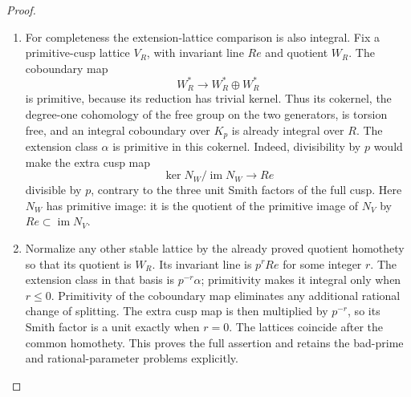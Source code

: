 \documentclass[11pt,a4paper]{article}
\theoremstyle{definition}
\begin{document}
\begin{proof}
\begin{enumerate}[label=\arabic*.]
\item For completeness the extension-lattice comparison is also
integral.  Fix a primitive-cusp lattice $V_R$, with invariant
line $Re$ and quotient $W_R$.
The coboundary map
\[
 W_R^*\longrightarrow W_R^*\oplus W_R^*
\]
is primitive, because its reduction has trivial kernel.
Thus its cokernel, the degree-one cohomology of the free
group on the two generators, is torsion free, and an
integral coboundary over $K_p$ is already integral over $R$.
The extension class $\alpha$ is primitive in this cokernel.
Indeed, divisibility by $p$ would make the extra cusp map
\[
 \ker N_W/\operatorname{im}N_W\longrightarrow Re
\]
divisible by $p$, contrary to the three unit Smith factors
of the full cusp.  Here $N_W$ has primitive image:
it is the quotient of the primitive image of $N_V$ by
$Re\subset\operatorname{im}N_V$.

\item Normalize any other stable lattice by the already proved
quotient homothety so that its quotient is $W_R$.
Its invariant line is $p^rRe$ for some integer $r$.
The extension class in that basis is $p^{-r}\alpha$;
primitivity makes it integral only when $r\leq0$.
Primitivity of the coboundary map eliminates any additional
rational change of splitting.  The extra cusp map is then
multiplied by $p^{-r}$, so its Smith factor is a unit exactly
when $r=0$.  The lattices coincide after the common homothety.
This proves the full assertion and retains the bad-prime
and rational-parameter problems explicitly.

\end{enumerate}
\end{proof}
\end{document}
